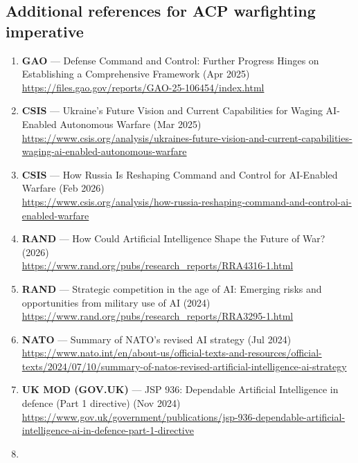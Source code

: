 \documentclass[
]{article}
\providecommand{\tightlist}{%
  \setlength{\itemsep}{0pt}\setlength{\parskip}{0pt}}
\begin{document}
\hypertarget{additional-references-for-acp-warfighting-imperative}{%
\subsection{Additional references for ACP warfighting
imperative}\label{additional-references-for-acp-warfighting-imperative}}

\begin{enumerate}
\def\labelenumi{\arabic{enumi}.}
\setcounter{enumi}{34}
\tightlist
\item
  \textbf{GAO} --- Defense Command and Control: Further Progress Hinges
  on Establishing a Comprehensive Framework (Apr 2025)\\
  \url{https://files.gao.gov/reports/GAO-25-106454/index.html}
\item
  \textbf{CSIS} --- Ukraine's Future Vision and Current Capabilities for
  Waging AI-Enabled Autonomous Warfare (Mar 2025)\\
  \url{https://www.csis.org/analysis/ukraines-future-vision-and-current-capabilities-waging-ai-enabled-autonomous-warfare}
\item
  \textbf{CSIS} --- How Russia Is Reshaping Command and Control for
  AI-Enabled Warfare (Feb 2026)\\
  \url{https://www.csis.org/analysis/how-russia-reshaping-command-and-control-ai-enabled-warfare}
\item
  \textbf{RAND} --- How Could Artificial Intelligence Shape the Future
  of War? (2026)\\
  \url{https://www.rand.org/pubs/research_reports/RRA4316-1.html}
\item
  \textbf{RAND} --- Strategic competition in the age of AI: Emerging
  risks and opportunities from military use of AI (2024)\\
  \url{https://www.rand.org/pubs/research_reports/RRA3295-1.html}
\item
  \textbf{NATO} --- Summary of NATO's revised AI strategy (Jul 2024)\\
  \url{https://www.nato.int/en/about-us/official-texts-and-resources/official-texts/2024/07/10/summary-of-natos-revised-artificial-intelligence-ai-strategy}
\item
  \textbf{UK MOD (GOV.UK)} --- JSP 936: Dependable Artificial
  Intelligence in defence (Part 1 directive) (Nov 2024)\\
  \url{https://www.gov.uk/government/publications/jsp-936-dependable-artificial-intelligence-ai-in-defence-part-1-directive}
\item

\end{enumerate}
\end{document}
